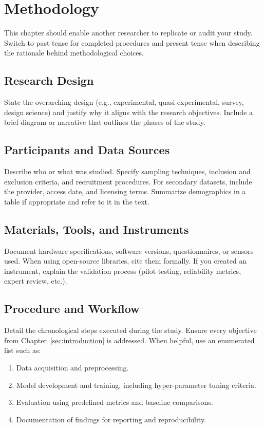 \section{Methodology}
\label{sec:methodology}

\noindent This chapter should enable another researcher to replicate or audit your
study. Switch to past tense for completed procedures and present tense when
describing the rationale behind methodological choices.

\subsection{Research Design}
State the overarching design (e.g., experimental, quasi-experimental, survey,
design science) and justify why it aligns with the research objectives. Include
a brief diagram or narrative that outlines the phases of the study.

\subsection{Participants and Data Sources}
Describe who or what was studied. Specify sampling techniques, inclusion and
exclusion criteria, and recruitment procedures. For secondary datasets, include
the provider, access date, and licensing terms. Summarize demographics in a
table if appropriate and refer to it in the text.

\subsection{Materials, Tools, and Instruments}
Document hardware specifications, software versions, questionnaires, or sensors
used. When using open-source libraries, cite them formally. If you created an
instrument, explain the validation process (pilot testing, reliability metrics,
expert review, etc.).

\subsection{Procedure and Workflow}
Detail the chronological steps executed during the study. Ensure every
objective from Chapter~\ref{sec:introduction} is addressed. When helpful, use
an enumerated list such as:

\begin{enumerate}
    \item Data acquisition and preprocessing.
    \item Model development and training, including hyper-parameter tuning criteria.
    \item Evaluation using predefined metrics and baseline comparisons.
    \item Documentation of findings for reporting and reproducibility.
\end{enumerate}

